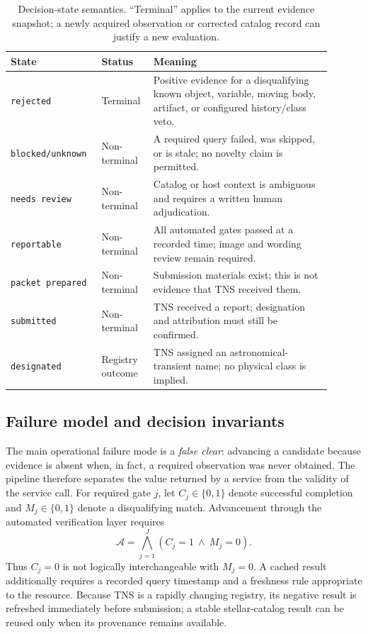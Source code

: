 \documentclass[11pt]{article}
\begin{document}
\begin{table}[ht]
\centering
\caption{Decision-state semantics. ``Terminal'' applies to the current evidence snapshot; a newly acquired observation or corrected catalog record can justify a new evaluation.}
\label{tab:states}
\begin{tabular}{p{0.23\linewidth}p{0.15\linewidth}p{0.52\linewidth}}
\toprule
State & Status & Meaning \\
\midrule
\texttt{rejected} & Terminal & Positive evidence for a disqualifying known object, variable, moving body, artifact, or configured history/class veto. \\
\texttt{blocked/unknown} & Non-terminal & A required query failed, was skipped, or is stale; no novelty claim is permitted. \\
\texttt{needs review} & Non-terminal & Catalog or host context is ambiguous and requires a written human adjudication. \\
\texttt{reportable} & Non-terminal & All automated gates passed at a recorded time; image and wording review remain required. \\
\texttt{packet prepared} & Non-terminal & Submission materials exist; this is not evidence that TNS received them. \\
\texttt{submitted} & Non-terminal & TNS received a report; designation and attribution must still be confirmed. \\
\texttt{designated} & Registry outcome & TNS assigned an astronomical-transient name; no physical class is implied. \\
\bottomrule
\end{tabular}
\end{table}

\subsection{Failure model and decision invariants}

The main operational failure mode is a \emph{false clear}: advancing a candidate because evidence is absent when, in fact, a required observation was never obtained. The pipeline therefore separates the value returned by a service from the validity of the service call. For required gate $j$, let $C_j\in\{0,1\}$ denote successful completion and $M_j\in\{0,1\}$ denote a disqualifying match. Advancement through the automated verification layer requires
\begin{equation}
  \mathcal{A}=\bigwedge_{j=1}^{J}(C_j=1\ \land\ M_j=0).
\label{eq:advance}
\end{equation}
Thus $C_j=0$ is not logically interchangeable with $M_j=0$. A cached result additionally requires a recorded query timestamp and a freshness rule appropriate to the resource. Because TNS is a rapidly changing registry, its negative result is refreshed immediately before submission; a stable stellar-catalog result can be reused only when its provenance remains available.
\end{document}
